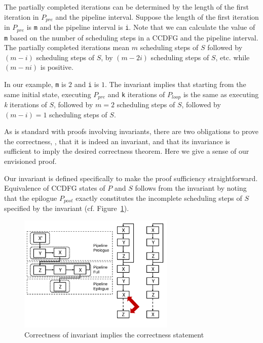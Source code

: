 The partially completed iterations can be determined by the
length of the first iteration in $P_{pre}$ and the pipeline interval.
Suppose the length of the first iteration in $P_{pre}$
is {\tt m} and the pipeline interval is {\tt i}. Note that we
can calculate the value of {\tt m} based on the number of scheduling steps in a CCDFG
and the pipeline interval. The partially completed iterations mean $m$
scheduling steps of $S$ followed by $(m-i)$ scheduling steps of $S$, by
$(m-2i)$ scheduling steps of $S$, etc. while $(m-ni)$ is positive.

In our example, {\tt m} is $2$
and {\tt i} is $1$.  The invariant implies that starting
from the same initial state, executing $P_{pre}$ and {\tt k}
iterations of $P_{loop}$ is the same as executing {\em k}
iterations of $S$, followed by $m = 2$ scheduling steps of
$S$, followed by $ (m - i) = 1$ scheduling steps of $S$.

As is standard with proofs involving invariants, there are
two obligations to prove the correctness, \viz, that it is indeed
an invariant, and that its invariance is sufficient to imply
the desired correctness theorem.  Here we give a sense of
our envisioned proof.

Our invariant is defined specifically to make the proof
sufficiency straightforward.
Equivalence of CCDFG states of $P$ and $S$ follows from the
invariant by noting that the epilogue $P_{post}$ exactly
constitutes the incomplete scheduling steps of $S$ specified
by the invariant
(cf. Figure~\ref{fig:invariant-implies-correctness}).

\begin{figure}[t!]
\begin{center}
\includegraphics[height=2.2in]{fig-proposal/invariant-implies-correctness}
\end{center}
\caption{Correctness of invariant implies the correctness statement}
\label{fig:invariant-implies-correctness}
\end{figure}

